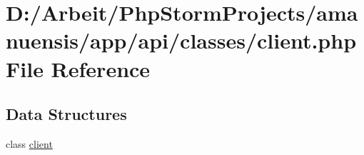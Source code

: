 \hypertarget{a00054}{}\section{D\+:/\+Arbeit/\+Php\+Storm\+Projects/amanuensis/app/api/classes/client.php File Reference}
\label{a00054}
\subsection*{Data Structures}
\begin{DoxyCompactItemize}
\item 
class \hyperlink{a00015}{client}
\end{DoxyCompactItemize}
